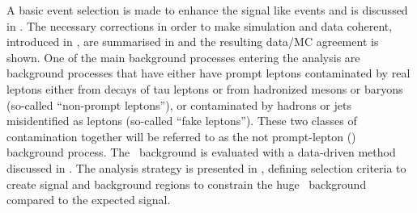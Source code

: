  A basic event selection is made to enhance the signal like events and is discussed in . The necessary  corrections in order to make simulation and data coherent, introduced in , are summarised in  and the resulting data/MC agreement is shown. One of the main background processes entering the analysis are background processes that have either have prompt leptons contaminated by real leptons either from decays of tau leptons or from hadronized mesons or baryons
 (so-called ``non-prompt leptons''), or contaminated by hadrons or jets misidentified as leptons (so-called ``fake leptons'').  These two classes  of contamination together will be referred to as the not prompt-lepton (\NPL) background process. The \NPL\ background  is
 evaluated with a data-driven method discussed in . The analysis strategy is presented in , defining selection criteria to create signal and background regions to constrain the huge \SM\ background compared to the expected signal. %


